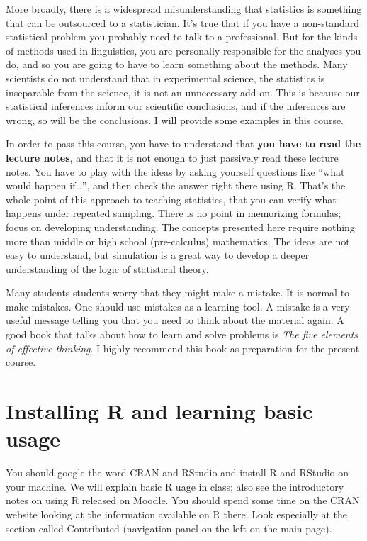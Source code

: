 \documentclass[12pt]{book}\usepackage[]{graphicx}\usepackage[]{color}
\begin{document}
More broadly, there is a widespread misunderstanding that statistics is something that can be outsourced to a statistician. It's true that if you have a non-standard statistical problem you probably need to talk to a professional. But for the kinds of methods used in linguistics, you are personally responsible for the analyses you do, and so you are going to have to learn something about the methods. Many scientists do not understand that in experimental science, the statistics is inseparable from the science, it is not an unnecessary add-on. This is because our statistical inferences inform our scientific conclusions, and if the inferences are wrong, so will be the conclusions. I will provide some examples in this course.

In order to pass this course, you have to understand that \textbf{you have to read the lecture notes}, and that
it is not enough to just passively read these lecture notes. You have to play with the ideas by asking yourself questions like ``what would happen if\dots'', and then check the answer right there using R. That's the whole point of this approach to teaching statistics, that you can verify what happens under repeated sampling. There is no point in memorizing formulas; focus on developing understanding. The concepts presented here require nothing more than middle or high school (pre-calculus) mathematics. The ideas are not easy to understand, but simulation is a great way to develop a deeper understanding of the logic of statistical theory.

Many students students worry that they might make a mistake.  It is normal to make mistakes. One should use mistakes as a learning tool. A mistake is a very useful message telling you that you need to think about the material again. A good book that talks about how to learn and solve problems is \textit{The five elements of effective thinking}. I highly recommend this book as preparation for the present course.

\section{Installing R and learning basic usage}

You should google the word CRAN and RStudio and install R and RStudio on your machine. We will explain basic R uage in class; also see the introductory notes on using R released on Moodle.
You should spend some time on the CRAN website looking at the information available on R there. Look especially at the section called Contributed (navigation panel on the left on the main page).
\end{document}
